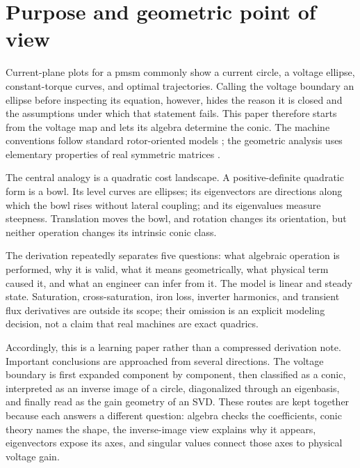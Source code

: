 \section{Purpose and geometric point of view}

Current-plane plots for a \gls{pmsm} commonly show a current circle, a voltage
ellipse, constant-torque curves, and optimal trajectories.  Calling the
voltage boundary an ellipse before inspecting its equation, however, hides the
reason it is closed and the assumptions under which that statement fails.
This paper therefore starts from the voltage map and lets its algebra determine
the conic.  The machine conventions follow standard rotor-oriented models
\cite{binder2017,schroeder2021}; the geometric analysis uses elementary
properties of real symmetric matrices \cite{horn2013}.

The central analogy is a quadratic cost landscape.  A positive-definite
quadratic form is a bowl.  Its level curves are ellipses; its eigenvectors are
directions along which the bowl rises without lateral coupling; and its
eigenvalues measure steepness.  Translation moves the bowl, and rotation
changes its orientation, but neither operation changes its intrinsic conic
class.



The derivation repeatedly separates five questions: what algebraic operation
is performed, why it is valid, what it means geometrically, what physical term
caused it, and what an engineer can infer from it.  The model is linear and
steady state.  Saturation, cross-saturation, iron loss, inverter harmonics, and
transient flux derivatives are outside its scope; their omission is an
explicit modeling decision, not a claim that real machines are exact quadrics.

Accordingly, this is a learning paper rather than a compressed derivation
note.  Important conclusions are approached from several directions.  The
voltage boundary is first expanded component by component, then classified as
a conic, interpreted as an inverse image of a circle, diagonalized through an
eigenbasis, and finally read as the gain geometry of an SVD.  These routes are
kept together because each answers a different question: algebra checks the
coefficients, conic theory names the shape, the inverse-image view explains
why it appears, eigenvectors expose its axes, and singular values connect
those axes to physical voltage gain.
